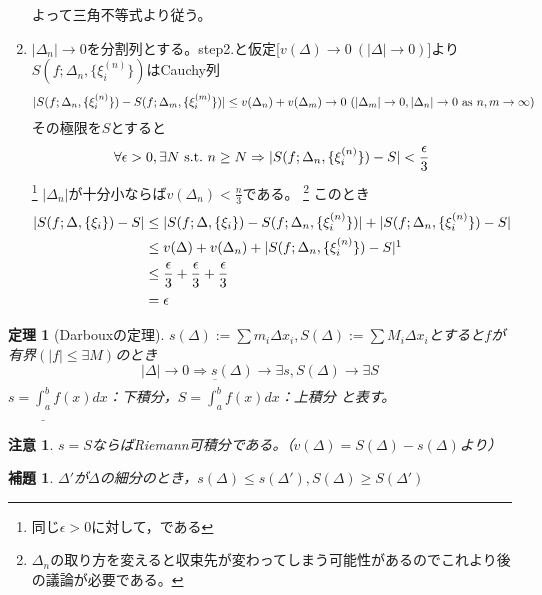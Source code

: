 \documentclass[dvipdfmx,a4j,10pt]{jsarticle}
\makeatletter
\theoremstyle{mystyle1}
\newtheorem{lem}[dfn]{補題}
\theoremstyle{mystyle2}
\newtheorem{thm*}{定理}
\newtheorem{note}{注意}
\renewenvironment{proof}[1][\proofname]{\par
  \pushQED{\qed}%
  \normalfont
  \topsep6\p@\@plus6\p@ \trivlist
  \item[\hskip\labelsep{\bfseries\sffamily #1}]\ignorespaces
}{%
  \popQED\endtrivlist\@endpefalse
}
\renewcommand\proofname{証明}
\makeatother
\begin{document}
\begin{proof}[定理\ref{def10.2}の証明]
\begin{enumerate}
\[    \]
    よって三角不等式より従う。
    \item $|\Delta_n|\to0$を分割列とする。step2.と仮定[$v(\Delta)\to0\ (|\Delta|\to0)$]より$S(f;\Delta_n,\{\xi_i^{(n)}\})$はCauchy列
    \[
    |S(f;\Delta_n,\{\xi_i^{(n)}\})-S(f;\Delta_m,\{\xi_i^{(m)}\})|\leq v(\Delta_n)+v(\Delta_m)\to0\ (|\Delta_m|\to0,|\Delta_n|\to0\ {\rm as}\ n,m\to\infty)
    \]
    その極限を$S$とすると
    \[
    \forall\epsilon>0,\exists N\ {\rm s.t.\ }n\geq N\Rightarrow |S(f;\Delta_n,\{\xi_i^{(n)}\})-S|<\frac{\epsilon}{3}
    \]
    \footnote{同じ$\epsilon>0$に対して，である}
    $|\Delta_n|$が十分小ならば$\displaystyle v(\Delta_n)<\frac{n}{3}$である。
    \footnote{
    $\Delta_n$の取り方を変えると収束先が変わってしまう可能性があるのでこれより後の議論が必要である。
    }
    このとき
    \[
    \begin{split}
    |S(f;\Delta,\{\xi_i\})-S|
    &\leq|S(f;\Delta,\{\xi_i\})-S(f;\Delta_n,\{\xi_i^{(n)}\})|+|S(f;\Delta_n,\{\xi_i^{(n)}\})-S|\\
    &\leq v(\Delta)+v(\Delta_n)+|S(f;\Delta_n,\{\xi_i^{(n)}\})-S|\footnotemark\\
    &\leq\frac{\epsilon}{3}+\frac{\epsilon}{3}+\frac{\epsilon}{3}\\
    &=\epsilon
    \end{split}
    \]
    \end{enumerate}
    \vspace{-2\baselineskip}
\end{proof}


\begin{framed}
    \begin{thm*}[Darbouxの定理]
        $\displaystyle s(\Delta):=\sum m_i\Delta x_i,S(\Delta):=\sum M_i\Delta x_i$とすると$f$が有界$(|f|\leq\exists M)$のとき
        \[
        |\Delta|\to0\Rightarrow s(\Delta)\to\exists s,S(\Delta)\to\exists S
        \]
        $\displaystyle s=\underline{\int_a^b}f(x)dx$：下積分，$\displaystyle S=\overline{\int_a^b} f(x)dx$：上積分
        と表す。
    \end{thm*}
\end{framed}

\begin{note}
    $s=S$ならばRiemann可積分である。（$v(\Delta)=S(\Delta)-s(\Delta)$より）
\end{note}

\begin{framed}
    \begin{lem}\label{hodai_saibun}
        $\Delta'$が$\Delta$の細分のとき，$s(\Delta)\leq s(\Delta'),S(\Delta)\geq S(\Delta')$
    \end{lem}
\end{framed}
\end{document}

